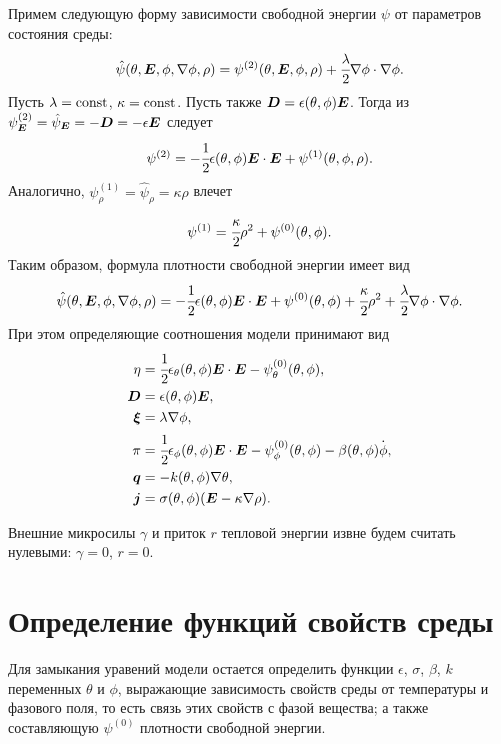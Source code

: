 Примем следующую форму зависимости свободной энергии $\psi$ от параметров состояния среды:
\[
    \hat{\psi}(\theta, {\boldsymbol{E}}, \phi, \nabla \phi, \rho) = \psi^{(2)}(\theta, {\boldsymbol{E}}, \phi, \rho) + \cfrac{\lambda}{2} \nabla \phi \cdot \nabla \phi.
\]
Пусть $\lambda = \operatorname{{const}}$, $\kappa = \operatorname{{const}}$. Пусть также ${\boldsymbol{D}} = \epsilon(\theta, \phi) {\boldsymbol{E}}$. Тогда из $\psi^{(2)}_{\boldsymbol{E}} = \hat{\psi}_{\boldsymbol{E}} = -{\boldsymbol{D}} = -\epsilon {\boldsymbol{E}}$ следует
\[
    \psi^{(2)} = -\cfrac{1}{2} \epsilon(\theta, \phi) {\boldsymbol{E}} \cdot {\boldsymbol{E}} + \psi^{(1)}(\theta, \phi, \rho).
\]
Аналогично, $\psi^{(1)}_\rho = \hat{\psi}_\rho = \kappa \rho$ влечет
\[
    \psi^{(1)} = \cfrac{\kappa}{2} \rho^2 + \psi^{(0)}(\theta, \phi).
\]
Таким образом, формула плотности свободной энергии имеет вид
\[
    \hat{\psi}(\theta, {\boldsymbol{E}}, \phi, \nabla \phi, \rho) = -\cfrac{1}{2} \epsilon(\theta, \phi) {\boldsymbol{E}} \cdot {\boldsymbol{E}} + \psi^{(0)}(\theta, \phi) + \cfrac{\kappa}{2} \rho^2 + \cfrac{\lambda}{2} \nabla \phi \cdot \nabla \phi.
\]
При этом определяющие соотношения модели принимают вид
\begin{align*}
    \eta &= \cfrac{1}{2} \epsilon_\theta(\theta, \phi) {\boldsymbol{E}} \cdot {\boldsymbol{E}} - \psi^{(0)}_\theta(\theta, \phi), \\
    {\boldsymbol{D}} &= \epsilon(\theta, \phi) {\boldsymbol{E}}, \\
    {\boldsymbol{\xi}} &= \lambda \nabla \phi, \\
    \pi &= \cfrac{1}{2} \epsilon_\phi(\theta, \phi) {\boldsymbol{E}} \cdot {\boldsymbol{E}} - \psi^{(0)}_\phi(\theta, \phi) - \beta(\theta, \phi) \overset{\boldsymbol{.}}{\phi}, \\
    {\boldsymbol{q}} &= -k(\theta, \phi) \nabla \theta, \\
    {\boldsymbol{j}} &= \sigma(\theta, \phi) ({\boldsymbol{E}} - \kappa \nabla \rho).
\end{align*}

Внешние микросилы $\gamma$ и приток $r$ тепловой энергии извне будем считать нулевыми: $\gamma = 0$, $r = 0$.


\section{Определение функций свойств среды}

Для замыкания уравений модели остается определить функции $\epsilon$, $\sigma$, $\beta$, $k$ переменных $\theta$ и $\phi$, выражающие зависимость свойств среды от температуры и фазового поля, то есть связь этих свойств с фазой вещества; а также составляющую $\psi^{(0)}$ плотности свободной энергии.


